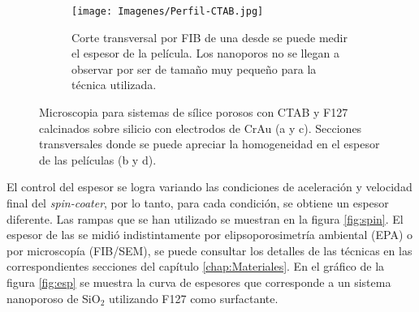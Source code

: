 \begin{figure}[th]
\begin{subfigure}[t]{0.49\textwidth}
			       		\label{fig:sem_homogeneidad3}
			       		\end{subfigure}
					\begin{subfigure}[t]{0.49\textwidth}
			 	   	    \texttt{[image: Imagenes/Perfil-CTAB.jpg]}
			       		\caption{Corte transversal por FIB de una \pdmC\space desde se puede medir el espesor de la película. Los nanoporos no se llegan a observar por ser de tamaño muy pequeño para la técnica utilizada.}
			       		\label{fig:sem_homogeneidad4}
			       		\end{subfigure}	
					 \caption[MEB \pdmC\space y \pdmF.]{Microscopia para sistemas de sílice porosos con CTAB y F127 calcinados sobre silicio con electrodos de Cr\textbar Au (a y c). Secciones transversales donde se puede apreciar la homogeneidad en el espesor de las películas (b y d).}
					 \label{fig:sem_homogeneidad}	
				     \vspace*{0.2cm}
				     \end{figure}

		El control del espesor se logra variando las condiciones de aceleración y velocidad final del \textit{spin-coater}, por lo tanto, para cada condición, se obtiene un espesor diferente. Las rampas que se han utilizado se muestran en la figura \ref{fig:spin}. El espesor de las \pdm\space se midió indistintamente por elipsoporosimetría ambiental (EPA) o por microscopía (FIB/SEM), se puede consultar los detalles de las técnicas en las correspondientes secciones del capítulo \ref{chap:Materiales}. En el gráfico de la figura \ref{fig:esp} se muestra la curva de espesores que corresponde a un sistema nanoporoso de SiO$_2$ utilizando F127 como surfactante. 

